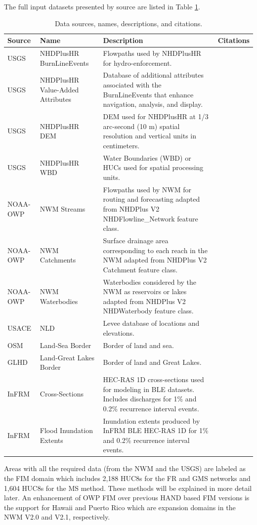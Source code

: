 The full input datasets presented by source are listed in Table \ref{tab:data}.
%
\begin{table}
\caption{Data sources, names, descriptions, and citations.}
\label{tab:data}
\centering
\begin{tabular}{|p{1.75cm}|p{4cm}|p{11cm}|p{5cm}|}
\hline
Source & Name & Description & Citations\\
\hline
USGS & NHDPlusHR BurnLineEvents & Flowpaths used by NHDPlusHR for hydro-enforcement. & \cite{nhdplus2022vectors} \\
\hline
USGS & NHDPlusHR Value-Added Attributes & Database of additional attributes associated with the BurnLineEvents that enhance navigation, analysis, and display. & \cite{nhdplus2022vectors} \\
\hline
USGS & NHDPlusHR DEM & DEM used for NHDPlusHR at 1/3 arc-second (10 m) spatial resolution and vertical units in centimeters. & \cite{nhdplus2022dems} \\
\hline
USGS & NHDPlusHR WBD & Water Boundaries (WBD) or HUCs used for spatial processing units. & \cite{nhdplus2022wbd} \\
\hline
NOAA-OWP & NWM Streams & Flowpaths used by NWM for routing and forecasting adapted from NHDPlus V2 NHDFlowline\_Network feature class. & \cite{nwm2022hydrofabric} \\
\hline
NOAA-OWP & NWM Catchments & Surface drainage area corresponding to each reach in the NWM adapted from NHDPlus V2 Catchment feature class. & \cite{nwm2022hydrofabric} \\
\hline
NOAA-OWP & NWM Waterbodies & Waterbodies considered by the NWM as reservoirs or lakes adapted from NHDPlus V2 NHDWaterbody feature class. & \cite{nwm2022hydrofabric} \\
\hline
USACE & NLD & Levee database of locations and elevations. & \cite{engineers2016national} \\
\hline
OSM & Land-Sea Border & Border of land and sea. & \cite{osm2021landsea} \\
\hline
GLHD & Land-Great Lakes Border & Border of land and Great Lakes. & \cite{GreatLakesHydrographyDataset} \\
\hline
InFRM & Cross-Sections & HEC-RAS 1D cross-sections used for modeling in BLE datasets. Includes discharges for 1\% and 0.2\% recurrence interval events. & \cite{fema2021estimated} \\
\hline
InFRM & Flood Inundation Extents & Inundation extents produced by InFRM BLE HEC-RAS 1D for 1\% and 0.2\% recurrence interval events. & \cite{fema2021estimated} \\
\hline
\end{tabular}
\end{table}
%
Areas with all the required data (from the NWM and the USGS) are labeled as the FIM domain which includes 2,188 HUC8s for the FR and GMS networks and 1,604 HUC8s for the MS method. 
These methods will be explained in more detail later.
An enhancement of OWP FIM over previous HAND based FIM versions is the support for Hawaii and Puerto Rico which are expansion domains in the NWM V2.0 and V2.1, respectively.
%
